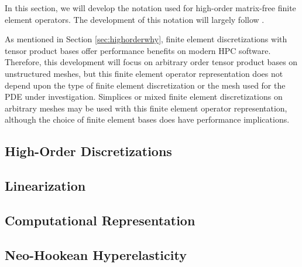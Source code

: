 In this section, we will develop the notation used for high-order matrix-free finite element operators.
The development of this notation will largely follow \cite{brown2010efficient}.

As mentioned in Section \ref{sec:highorderwhy}, finite element discretizations with tensor product bases offer performance benefits on modern HPC software.
Therefore, this development will focus on arbitrary order tensor product bases on unstructured meshes, but this finite element operator representation does not depend upon the type of finite element discretization or the mesh used for the PDE under investigation.
Simplices or mixed finite element discretizations on arbitrary meshes may be used with this finite element operator representation, although the choice of finite element bases does have performance implications.

\subsection{High-Order Discretizations} \label{sec:highorderdiscretizations}


\subsection{Linearization}


\subsection{Computational Representation}


\subsection{Neo-Hookean Hyperelasticity}

